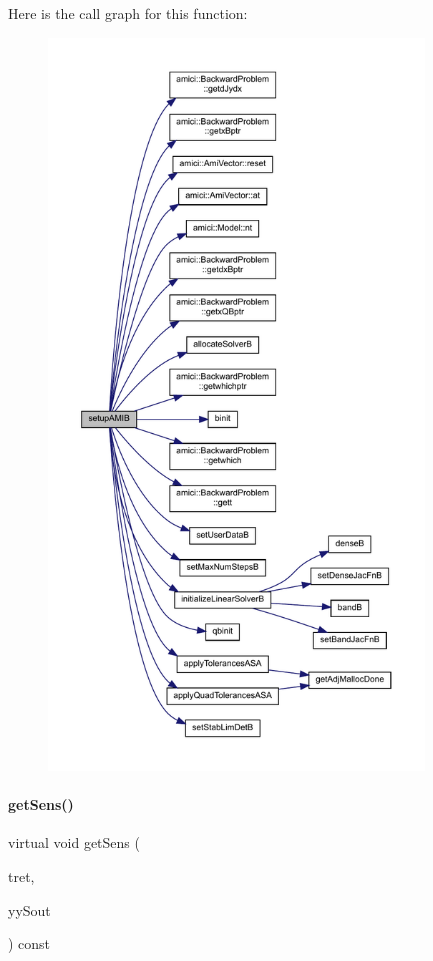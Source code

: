 Here is the call graph for this function\+:
\nopagebreak
\begin{figure}[H]
\begin{center}
\leavevmode
\includegraphics[height=550pt]{classamici_1_1_solver_a04ef010145a9a17746128e55d4e0a436_cgraph}
\end{center}
\end{figure}
\mbox{\label{classamici_1_1_solver_a0db027ca9e9778c0b40afdb80f11a3af}} 
\paragraph{\texorpdfstring{get\+Sens()}{getSens()}}
{\footnotesize\ttfamily virtual void get\+Sens (\begin{DoxyParamCaption}\item[{\mbox{\hyperlink{namespaceamici_a1bdce28051d6a53868f7ccbf5f2c14a3}{realtype}} $\ast$}]{tret,  }\item[{\mbox{\hyperlink{classamici_1_1_ami_vector_array}{Ami\+Vector\+Array}} $\ast$}]{yy\+Sout }\end{DoxyParamCaption}) const\hspace{0.3cm}{\ttfamily [pure virtual]}}

